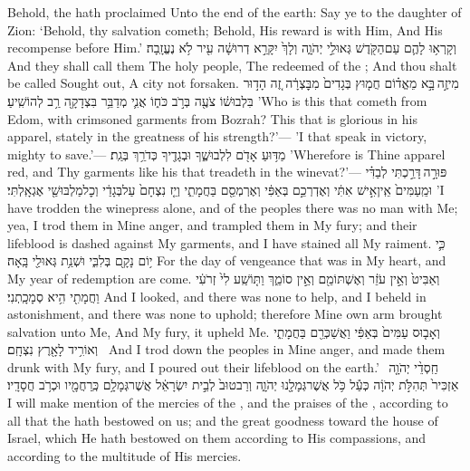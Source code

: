{Behold, the \lord\space hath proclaimed Unto the end of the earth: Say ye to the daughter of Zion: ‘Behold, thy salvation cometh; Behold, His reward is with Him, And His recompense before Him.’}
{וְקָרְא֥וּ לָהֶ֛ם עַם\maqqaf הַקֹּ֖דֶשׁ גְּאוּלֵ֣י יְהֹוָ֑ה וְלָךְ֙ יִקָּרֵ֣א דְרוּשָׁ֔ה עִ֖יר לֹ֥א נֶעֱזָֽבָה׃ \setuma }
{And they shall call them The holy people, The redeemed of the \lord; And thou shalt be called Sought out, A city not forsaken.}
\newperek
{}
{מִי\maqqaf זֶ֣ה \legarmeh  בָּ֣א מֵאֱד֗וֹם חֲמ֤וּץ בְּגָדִים֙ מִבׇּצְרָ֔ה זֶ֚ה הָד֣וּר בִּלְבוּשׁ֔וֹ צֹעֶ֖ה בְּרֹ֣ב כֹּח֑וֹ אֲנִ֛י מְדַבֵּ֥ר בִּצְדָקָ֖ה רַ֥ב לְהוֹשִֽׁיעַ׃}
{’Who is this that cometh from Edom, with crimsoned garments from Bozrah? This that is glorious in his apparel, stately in the greatness of his strength?’— ’I that speak in victory, mighty to save.’—}
{מַדּ֥וּעַ אָדֹ֖ם לִלְבוּשֶׁ֑ךָ וּבְגָדֶ֖יךָ כְּדֹרֵ֥ךְ בְּגַֽת׃}
{’Wherefore is Thine apparel red, and Thy garments like his that treadeth in the winevat?’—}
{פּוּרָ֣ה \legarmeh  דָּרַ֣כְתִּי לְבַדִּ֗י וּמֵֽעַמִּים֙ אֵֽין\maqqaf אִ֣ישׁ אִתִּ֔י וְאֶדְרְכֵ֣ם בְּאַפִּ֔י וְאֶרְמְסֵ֖ם בַּחֲמָתִ֑י וְיֵ֤ז נִצְחָם֙ עַל\maqqaf בְּגָדַ֔י וְכׇל\maqqaf מַלְבּוּשַׁ֖י אֶגְאָֽלְתִּי׃}
{’I have trodden the winepress alone, and of the peoples there was no man with Me; yea, I trod them in Mine anger, and trampled them in My fury; and their lifeblood is dashed against My garments, and I have stained all My raiment.}
{כִּ֛י י֥וֹם נָקָ֖ם בְּלִבִּ֑י וּשְׁנַ֥ת גְּאוּלַ֖י בָּֽאָה׃}
{For the day of vengeance that was in My heart, and My year of redemption are come.}
{וְאַבִּיט֙ וְאֵ֣ין עֹזֵ֔ר וְאֶשְׁתּוֹמֵ֖ם וְאֵ֣ין סוֹמֵ֑ךְ וַתּ֤וֹשַֽׁע לִי֙ זְרֹעִ֔י וַחֲמָתִ֖י הִ֥יא סְמָכָֽתְנִי׃}
{And I looked, and there was none to help, and I beheld in astonishment, and there was none to uphold; therefore Mine own arm brought salvation unto Me, And My fury, it upheld Me.}
{וְאָב֤וּס עַמִּים֙ בְּאַפִּ֔י וַאֲשַׁכְּרֵ֖ם בַּחֲמָתִ֑י וְאוֹרִ֥יד לָאָ֖רֶץ נִצְחָֽם׃ \setuma }
{And I trod down the peoples in Mine anger, and made them drunk with My fury, and I poured out their lifeblood on the earth.’}
{חַֽסְדֵ֨י יְהֹוָ֤ה \pasek  אַזְכִּיר֙ תְּהִלֹּ֣ת יְהֹוָ֔ה כְּעַ֕ל כֹּ֥ל אֲשֶׁר\maqqaf גְּמָלָ֖נוּ יְהֹוָ֑ה וְרַב\maqqaf טוּב֙ לְבֵ֣ית יִשְׂרָאֵ֔ל אֲשֶׁר\maqqaf גְּמָלָ֥ם כְּֽרַחֲמָ֖יו וּכְרֹ֥ב חֲסָדָֽיו׃}
{I will make mention of the mercies of the \lord, and the praises of the \lord, according to all that the \lord\space hath bestowed on us; and the great goodness toward the house of Israel, which He hath bestowed on them according to His compassions, and according to the multitude of His mercies.}
